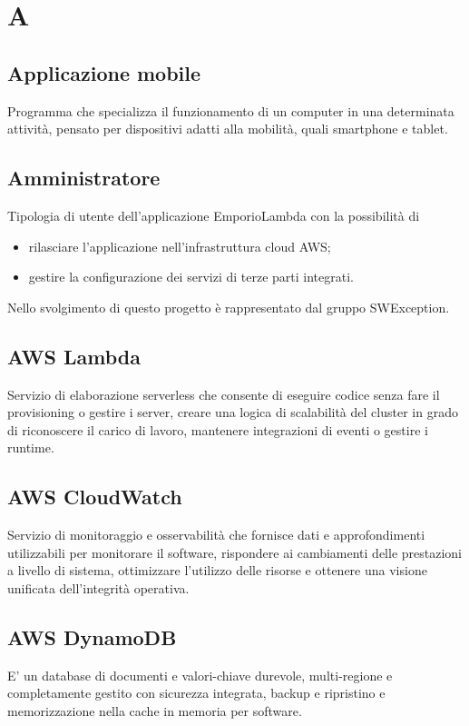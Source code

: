 \section*{A}
\subsection*{Applicazione mobile}
Programma che specializza il funzionamento di un computer in una determinata attività,
pensato per dispositivi adatti alla mobilità, quali smartphone e tablet.

\subsection*{Amministratore}
Tipologia di utente dell'applicazione EmporioLambda con la possibilità di
\begin{itemize}
    \item rilasciare l'applicazione nell'infrastruttura cloud AWS;
    \item gestire la configurazione dei servizi di terze parti integrati.
\end{itemize}
Nello svolgimento di questo progetto è rappresentato dal gruppo SWException.

\subsection*{AWS Lambda}
Servizio di elaborazione serverless che consente di eseguire codice senza fare il provisioning o gestire i server, creare una logica di scalabilità del cluster in grado di riconoscere il carico di lavoro, mantenere integrazioni di eventi o gestire i runtime.

\subsection*{AWS CloudWatch}
Servizio di monitoraggio e osservabilità che fornisce dati e approfondimenti utilizzabili per monitorare il software, rispondere ai cambiamenti delle prestazioni a livello di sistema, ottimizzare l'utilizzo delle risorse e ottenere una visione unificata dell'integrità operativa.

\subsection*{AWS DynamoDB}
E' un database di documenti e valori-chiave durevole, multi-regione e completamente gestito con sicurezza integrata, backup e ripristino e memorizzazione nella cache in memoria per software.

